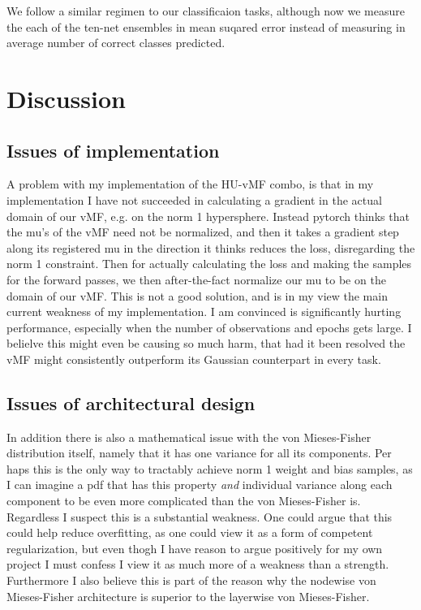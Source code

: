 \documentclass[nofootinbib,UKenglish,nobalancelastpage,12pt]{article}
\begin{document}
We follow a similar regimen to our classificaion tasks, although now we measure the each of the ten-net ensembles in mean suqared error instead of measuring in average number of correct classes predicted.
\clearpage
\section{Discussion}

\subsection{Issues of implementation}
A problem with my implementation of the HU-vMF combo, is that in my implementation I have not succeeded in calculating a gradient in the actual domain of our vMF, e.g. on the norm 1 hypersphere. Instead pytorch thinks that the mu's of the vMF need not be normalized, and then it takes a gradient step along its registered mu in the direction it thinks reduces the loss, disregarding the norm 1 constraint. Then for actually calculating the loss and making the samples for the forward passes, we then after-the-fact normalize our mu to be on the domain of our vMF. This is not a good solution, and is in my view the main current weakness of my implementation. I am convinced is significantly hurting performance, especially when the number of observations and epochs gets large. I belielve this might even be causing so much harm, that had it been resolved the vMF might consistently outperform its Gaussian counterpart in every task.

\subsection{Issues of architectural design}
In addition there is also a mathematical issue with the von Mieses-Fisher distribution itself, namely that it has one variance for all its components. Per haps this is the only way to tractably achieve norm 1 weight and bias samples, as I can imagine a pdf that has this property \textit{and} individual variance along each component to be even more complicated than the von Mieses-Fisher is. Regardless I suspect this is a substantial weakness. One could argue that this could help reduce overfitting, as one could view it as a form of competent regularization, but even thogh I have reason to argue positively for my own project I must confess I view it as much more of a weakness than a strength. Furthermore I also believe this is part of the reason why the nodewise von Mieses-Fisher architecture is superior to the layerwise von Mieses-Fisher. 

\clearpage


\end{document}

